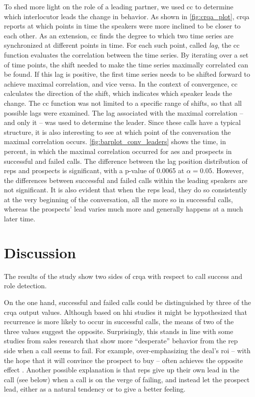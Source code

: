 To shed more light on the role of a leading partner, we used \acl{cc} to determine which interlocutor leads the change in behavior.
As shown in \cref{fig:crqa_plot}, \ac{crqa} reports at which points in time the speakers were more inclined to be closer to each other.
As an extension, \acl{cc} finds the degree to which two time series are synchronized at different points in time.
For each such point, called \emph{lag}, the \acl{cc} function evaluates the correlation between the time series.
By iterating over a set of time points, the shift needed to make the time series maximally correlated can be found.
If this lag is positive, the first time series needs to be shifted forward to achieve maximal correlation, and vice versa.
In the context of convergence, \ac{cc} calculates the direction of the shift, which indicates which speaker leads the change.
The \acl{cc} function was not limited to a specific range of shifts, so that all possible lags were examined.
The lag associated with the maximal correlation -- and only it -- was used to determine the leader.
Since these calls have a typical structure, it is also interesting to see at which point of the conversation the maximal correlation occurs.
\cref{fig:barplot_conv_leaders} shows the time, in percent, in which the maximal correlation occurred for \acp{ae} and prospects in successful and failed calls.
The difference between the lag position distribution of reps and prospects is significant, with a p-value of \num{0.0065} at $\alpha = 0.05$.
However, the differences between successful and failed calls within the leading speakers are not significant.
It is also evident that when the reps lead, they do so consistently at the very beginning of the conversation, all the more so in successful calls, whereas the prospects' lead varies much more and generally happens at a much later time.

\section{Discussion}
\label{discussion}

The results of the study show two sides of \ac{crqa} with respect to call success and role detection.

On the one hand, successful and failed calls could be distinguished by three of the \ac{crqa} output values.
Although based on \ac{hhi} studies it might be hypothesized that recurrence is more likely to occur in successful calls, the means of two of the three values suggest the opposite.
Surprisingly, this stands in line with some studies from sales research that show more \enquote{desperate} behavior from the rep side when a call seems to fail.
For example, over-emphasizing the deal's \ac{roi} -- with the hope that it will convince the prospect to buy -- often achieves the opposite effect \citep{Orlob2018roi}.
Another possible explanation is that reps give up their own lead in the call (see below) when a call is on the verge of failing, and instead let the prospect lead, either as a natural tendency or to give a better feeling.

